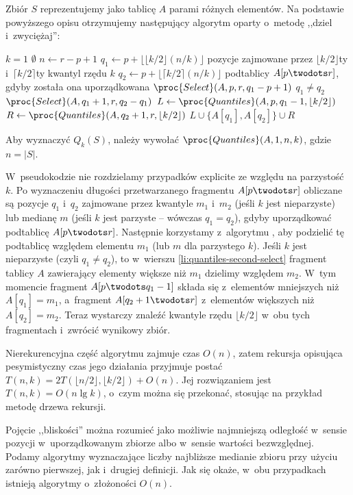 Zbiór $S$ reprezentujemy jako tablicę $A$ parami różnych elementów.
Na podstawie powyższego opisu otrzymujemy następujący algorytm oparty o~metodę ,,dziel i~zwyciężaj'':
\begin{codebox}
\li	\If $k=1$
\li		\Then \Return $\emptyset$
		\End
\li	$n\gets r-p+1$
\li	$q_1\gets p+\lfloor\lfloor k/2\rfloor(n/k)\rfloor$ \>\>\>\>\>\>\Comment pozycje zajmowane przez $\lfloor k/2\rfloor$\nbhyphen ty i~$\lceil k/2\rceil$\nbhyphen ty kwantyl rzędu $k$
\li	$q_2\gets p+\lfloor\lceil k/2\rceil(n/k)\rfloor$ \>\>\>\>\>\>\>podtablicy $A[p\twodots r]$, gdyby została ona uporządkowana
\li	$\proc{Select}(A,p,r,q_1-p+1)$
\li	\If $q_1\ne q_2$
\li		\Then $\proc{Select}(A,q_1+1,r,q_2-q_1)$ \label{li:quantiles-second-select}
		\End
\li	$L\gets\proc{Quantiles}(A,p,q_1-1,\lfloor k/2\rfloor)$
\li	$R\gets\proc{Quantiles}(A,q_2+1,r,\lfloor k/2\rfloor)$
\li	\Return $L\cup\{A[q_1],A[q_2]\}\cup R$
\end{codebox}
Aby wyznaczyć $Q_k(S)$, należy wywołać $\proc{Quantiles}(A,1,n,k)$, gdzie $n=|S|$.

W~pseudokodzie nie rozdzielamy przypadków explicite ze względu na parzystość $k$.
Po wyznaczeniu długości przetwarzanego fragmentu $A[p\twodots r]$ obliczane są pozycje $q_1$ i~$q_2$ zajmowane przez kwantyle $m_1$ i~$m_2$ (jeśli $k$ jest nieparzyste) lub medianę $m$ (jeśli $k$ jest parzyste -- wówczas $q_1=q_2$), gdyby uporządkować podtablicę $A[p\twodots r]$.
Następnie korzystamy z~algorytmu , aby podzielić tę podtablicę względem elementu $m_1$ (lub $m$ dla parzystego $k$).
Jeśli $k$ jest nieparzyste (czyli $q_1\ne q_2$), to w~wierszu \ref{li:quantiles-second-select} fragment tablicy $A$ zawierający elementy większe niż $m_1$ dzielimy względem $m_2$.
W~tym momencie fragment $A[p\twodots q_1-1]$ składa się z~elementów mniejszych niż $A[q_1]=m_1$, a~fragment $A[q_2+1\twodots r]$ z~elementów większych niż $A[q_2]=m_2$.
Teraz wystarczy znaleźć kwantyle rzędu $\lfloor k/2\rfloor$ w~obu tych fragmentach i~zwrócić wynikowy zbiór.

Nierekurencyjna część algorytmu zajmuje czas $O(n)$, zatem rekursja opisująca pesymistyczny czas jego działania przyjmuje postać $T(n,k)=2T(\lfloor n/2\rfloor,\lfloor k/2\rfloor)+O(n)$.
Jej rozwiązaniem jest $T(n,k)=O(n\lg k)$, o~czym można się przekonać, stosując na przykład metodę drzewa rekursji.

\exercise %
Pojęcie ,,bliskości'' można rozumieć jako możliwie najmniejszą odległość w~sensie pozycji w~uporządkowanym zbiorze albo w~sensie wartości bezwzględnej.
Podamy algorytmy wyznaczające liczby najbliższe medianie zbioru przy użyciu zarówno pierwszej, jak i~drugiej definicji.
Jak się okaże, w~obu przypadkach istnieją algorytmy o~złożoności $O(n)$.

